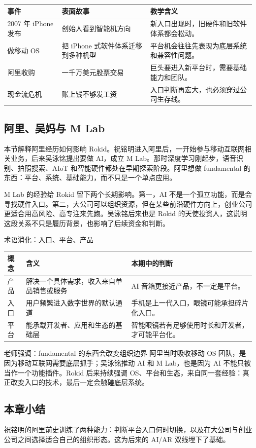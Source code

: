 \noindent\begin{tabularx}{\textwidth}{p{}p{}X}
\toprule
事件 & 表面故事 & 教学含义 \\
\midrule
2007 年 iPhone 发布 & 创始人看到智能机方向 & 新入口出现时，旧硬件和旧软件体系都会松动。 \\
做移动 OS & 把 iPhone 式软件体系迁移到多种机型 & 平台机会往往先表现为底层系统和兼容性问题。 \\
阿里收购 & 一千万美元股票交易 & 巨头要进入新平台时，需要基础能力和团队。 \\
现金流危机 & 账上钱不够发工资 & 入口判断再宏大，也必须穿过公司生存线。 \\
\bottomrule
\end{tabularx}

\subsection{阿里、吴妈与 M Lab}

本节解释阿里经历如何影响 Rokid。祝铭明进入阿里后，一开始参与移动互联网相关业务，后来吴泳铭提出要做 AI，成立 M Lab。那时深度学习刚起步，语音识别、拍照搜索、AIoT 和智能硬件都处在早期探索阶段。阿里想做 fundamental 的东西：平台、系统、基础能力，而不只是一个单点应用。

M Lab 的经验给 Rokid 留下两个长期影响。第一，AI 不是一个孤立功能，而是会寻找硬件入口。第二，大公司可以组织资源，但在某些前沿硬件方向上，创业公司更适合用高风险、高专注来先跑。吴泳铭后来也是 Rokid 的天使投资人，这说明这段关系不只是履历背景，也影响了后续资金和判断。

\begin{knowledgebox}{术语消化：入口、平台、产品}
\noindent\begin{tabularx}{\textwidth}{p{}p{}X}
\toprule
概念 & 含义 & 本期中的判断 \\
\midrule
产品 & 解决一个具体需求，收入来自单品销售或服务 & AI 音箱更接近产品，不一定是平台。 \\
入口 & 用户频繁进入数字世界的默认通道 & 手机是上一代入口，眼镜可能承担碎片化入口。 \\
平台 & 能承载开发者、应用和生态的基础层 & 智能眼镜若有足够使用时长和开发者，才可能平台化。 \\
\bottomrule
\end{tabularx}
\end{knowledgebox}

\begin{importantbox}{老师强调：fundamental 的东西会改变组织边界}
阿里当时吸收移动 OS 团队，是因为移动互联网需要底层抓手；吴泳铭推动 AI 和 M Lab，也是因为 AI 不能只被当作一个功能插件。Rokid 后来持续强调 OS、平台和生态，来自同一套经验：真正改变入口的技术，最后一定会触碰底层系统。
\end{importantbox}

\subsection{本章小结}

祝铭明的阿里前史训练了两种能力：判断平台入口何时切换，以及在大公司与创业公司之间选择适合自己的组织形态。这为后来的 AI/AR 双线埋下了基础。

